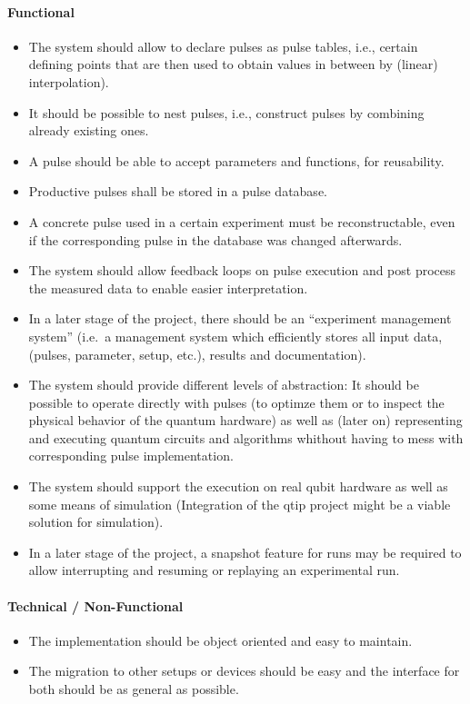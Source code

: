 \documentclass[a4paper,12pt]{article}
\begin{document}
\paragraph{Functional}
\begin{itemize} \itemsep-0.5pt
 \item The system should allow to declare pulses as pulse tables, i.e., certain defining points that are then used to obtain values in between by (linear) interpolation).
 \item It should be possible to nest pulses, i.e., construct pulses by combining already existing ones.
 \item A pulse should be able to accept parameters and functions, for reusability.
 \item Productive pulses shall be stored in a pulse database.
 \item A concrete pulse used in a certain experiment must be reconstructable, even if the corresponding pulse in the database was changed afterwards.
 \item The system should allow feedback loops on pulse execution and post process the measured data to enable easier interpretation.
 \item In a later stage of the project, there should be an ``experiment management system'' (i.e.~a management system which efficiently stores all input data, (pulses, parameter, setup, etc.), results and documentation).
 \item The system should provide different levels of abstraction: It should be possible to operate directly with pulses (to optimze them or to inspect the physical behavior of the quantum hardware) as well as (later on) representing and executing quantum circuits and algorithms whithout having to mess with corresponding pulse implementation.
 \item The system should support the execution on real qubit hardware as well as some means of simulation (Integration of the qtip project might be a viable solution for simulation).
 \item In a later stage of the project, a snapshot feature for runs may be required to allow interrupting and resuming or replaying an experimental run.
 
\end{itemize}

\paragraph{Technical / Non-Functional}
\begin{itemize} \itemsep-0.5pt
  \item The implementation should be object oriented and easy to maintain.
  \item The migration to other setups or devices should be easy and the interface for both should be as general as possible.
\end{itemize}
\end{document}
